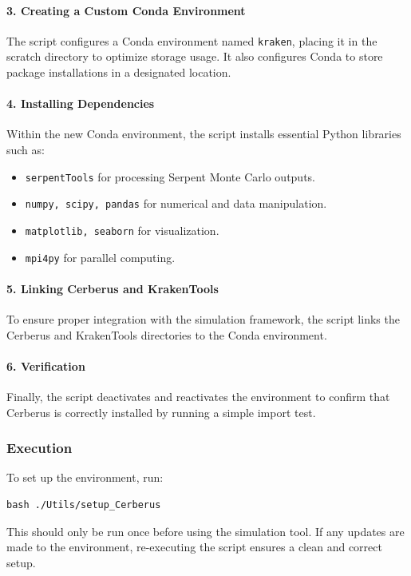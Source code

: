 \documentclass{article}
\begin{document}
\paragraph{3. Creating a Custom Conda Environment}  
The script configures a Conda environment named \texttt{kraken}, placing it in the scratch directory to optimize storage usage. It also configures Conda to store package installations in a designated location.

\paragraph{4. Installing Dependencies}  
Within the new Conda environment, the script installs essential Python libraries such as:
\begin{itemize}
    \item \texttt{serpentTools} for processing Serpent Monte Carlo outputs.
    \item \texttt{numpy, scipy, pandas} for numerical and data manipulation.
    \item \texttt{matplotlib, seaborn} for visualization.
    \item \texttt{mpi4py} for parallel computing.
\end{itemize}

\paragraph{5. Linking Cerberus and KrakenTools}  
To ensure proper integration with the simulation framework, the script links the Cerberus and KrakenTools directories to the Conda environment.

\paragraph{6. Verification}  
Finally, the script deactivates and reactivates the environment to confirm that Cerberus is correctly installed by running a simple import test.

\subsubsection{Execution}
To set up the environment, run:
\begin{lstlisting}
bash ./Utils/setup_Cerberus
\end{lstlisting}
This should only be run once before using the simulation tool. If any updates are made to the environment, re-executing the script ensures a clean and correct setup.
\end{document}
